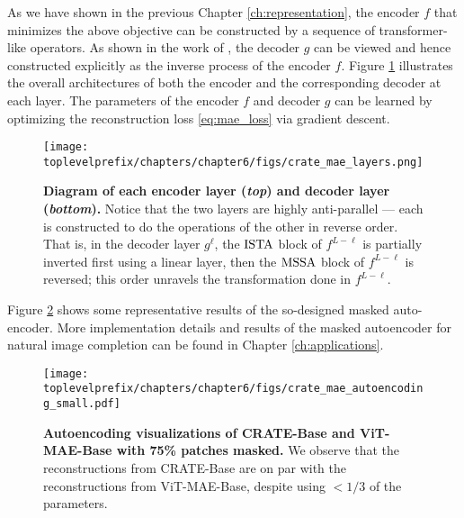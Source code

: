 \documentclass[../../book-main.tex]{subfiles}
\begin{document}
As we have shown in the previous Chapter \ref{ch:representation}, the
encoder $f$ that minimizes the above objective can be constructed by
a sequence of transformer-like operators. As shown in the work of
\cite{Pai2024masked}, the decoder $g$ can be viewed and hence
constructed explicitly as the inverse process of the encoder $f$.
Figure \ref{fig:crate_mae_layers} illustrates the overall
architectures of both the encoder and the corresponding decoder at
each layer. The parameters of the encoder $f$ and decoder $g$ can be
learned by optimizing the reconstruction loss \eqref{eq:mae_loss} via
gradient descent.

\begin{figure}[t!]
\centering
\texttt{[image: \\toplevelprefix/chapters/chapter6/figs/crate\_mae\_layers.png]}
\caption{\small \textbf{Diagram of each encoder layer
  (\textit{top}) and decoder layer (\textit{bottom}).} Notice that
  the two layers are highly anti-parallel --- each is constructed to
  do the operations of the other in reverse order. That is, in the
  decoder layer \(g^{\ell}\), the \(\operatorname{ISTA}\) block of \(f^{L - \ell}\)
  is partially inverted first using a linear layer, then the
  \(\operatorname{MSSA}\) block of \(f^{L - \ell}\) is reversed; this order
unravels the transformation done in \(f^{L - \ell}\).}
\label{fig:crate_mae_layers}
\end{figure}

Figure \ref{fig:mae_autoencoding-small} shows some representative
results of the so-designed masked auto-encoder. More implementation details and
results of the masked autoencoder for natural image completion can be
found in Chapter \ref{ch:applications}.
\begin{figure}[t]
\centering
\texttt{[image: \\toplevelprefix/chapters/chapter6/figs/crate\_mae\_autoencoding\_small.pdf]}
\caption{\small \textbf{Autoencoding visualizations of CRATE-Base
  and ViT-MAE-Base \cite{he2022masked} with 75\% patches masked.}
  We observe that the reconstructions from CRATE-Base are on par
  with the reconstructions from ViT-MAE-Base, despite using \(<
  1/3\) of the parameters.
}
\label{fig:mae_autoencoding-small}
\end{figure}
\end{document}

